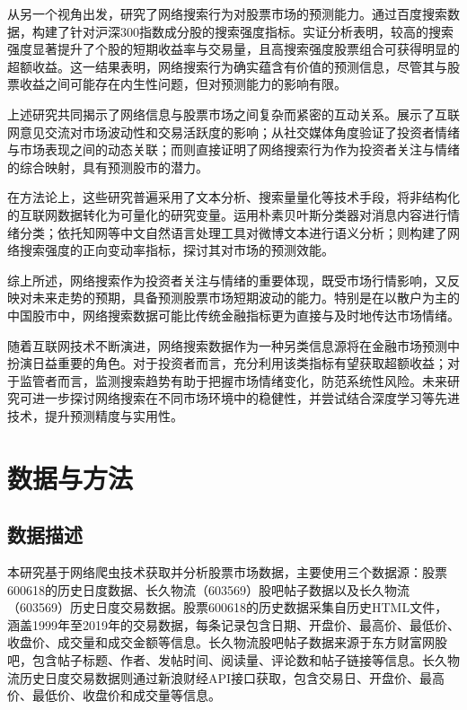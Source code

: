 \documentclass[12pt, a4paper]{article}
\begin{document}
从另一个视角出发，\citet{zhang2014internet}研究了网络搜索行为对股票市场的预测能力。通过百度搜索数据，构建了针对沪深300指数成分股的搜索强度指标。实证分析表明，较高的搜索强度显著提升了个股的短期收益率与交易量，且高搜索强度股票组合可获得明显的超额收益。这一结果表明，网络搜索行为确实蕴含有价值的预测信息，尽管其与股票收益之间可能存在内生性问题，但对预测能力的影响有限。

上述研究共同揭示了网络信息与股票市场之间复杂而紧密的互动关系。\citet{antweiler2004information}展示了互联网意见交流对市场波动性和交易活跃度的影响；\citet{cheng2013investor}从社交媒体角度验证了投资者情绪与市场表现之间的动态关联；而\citet{zhang2014internet}则直接证明了网络搜索行为作为投资者关注与情绪的综合映射，具有预测股市的潜力。

在方法论上，这些研究普遍采用了文本分析、搜索量量化等技术手段，将非结构化的互联网数据转化为可量化的研究变量。\citet{antweiler2004information}运用朴素贝叶斯分类器对消息内容进行情绪分类；\citet{cheng2013investor}依托知网等中文自然语言处理工具对微博文本进行语义分析；\citet{zhang2014internet}则构建了网络搜索强度的正向变动率指标，探讨其对市场的预测效能。

综上所述，网络搜索作为投资者关注与情绪的重要体现，既受市场行情影响，又反映对未来走势的预期，具备预测股票市场短期波动的能力。特别是在以散户为主的中国股市中，网络搜索数据可能比传统金融指标更为直接与及时地传达市场情绪。

随着互联网技术不断演进，网络搜索数据作为一种另类信息源将在金融市场预测中扮演日益重要的角色。对于投资者而言，充分利用该类指标有望获取超额收益；对于监管者而言，监测搜索趋势有助于把握市场情绪变化，防范系统性风险。未来研究可进一步探讨网络搜索在不同市场环境中的稳健性，并尝试结合深度学习等先进技术，提升预测精度与实用性。

\section{数据与方法}

\subsection{数据描述}
本研究基于网络爬虫技术获取并分析股票市场数据，主要使用三个数据源：股票600618的历史日度数据、长久物流（603569）股吧帖子数据以及长久物流（603569）历史日度交易数据。股票600618的历史数据采集自历史HTML文件，涵盖1999年至2019年的交易数据，每条记录包含日期、开盘价、最高价、最低价、收盘价、成交量和成交金额等信息。长久物流股吧帖子数据来源于东方财富网股吧，包含帖子标题、作者、发帖时间、阅读量、评论数和帖子链接等信息。长久物流历史日度交易数据则通过新浪财经API接口获取，包含交易日、开盘价、最高价、最低价、收盘价和成交量等信息。
\end{document}
